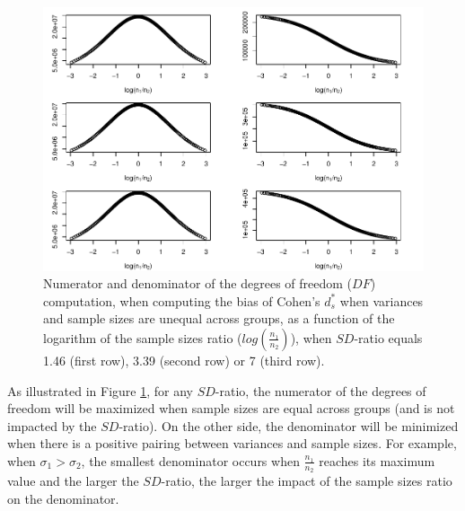 \documentclass[
  english,
  man]{apa6}
\begin{document}
\begin{figure}
\centering
\includegraphics{Theoretical-Bias-of-all-estimators-as-a-function-of-population-parameters_files/figure-latex/dfnumdenomcohendprimehetunbalnratiosdratio2-1.pdf}
\caption{\label{fig:dfnumdenomcohendprimehetunbalnratiosdratio2}Numerator and denominator of the degrees of freedom (\(DF\)) computation, when computing the bias of Cohen's \(d^*_s\) when variances and sample sizes are unequal across groups, as a function of the logarithm of the sample sizes ratio (\(log \left( \frac{n_1}{n_2} \right)\)), when \(SD\)-ratio equals 1.46 (first row), 3.39 (second row) or 7 (third row).}
\end{figure}

As illustrated in Figure \ref{fig:dfnumdenomcohendprimehetunbalnratiosdratio2}, for any \(SD\)-ratio, the numerator of the degrees of freedom will be maximized when sample sizes are equal across groups (and is not impacted by the \(SD\)-ratio). On the other side, the denominator will be minimized when there is a positive pairing between variances and sample sizes. For example, when \(\sigma_1 > \sigma_2\), the smallest denominator occurs when \(\frac{n_1}{n_2}\) reaches its maximum value and the larger the \(SD\)-ratio, the larger the impact of the sample sizes ratio on the denominator.
\end{document}
